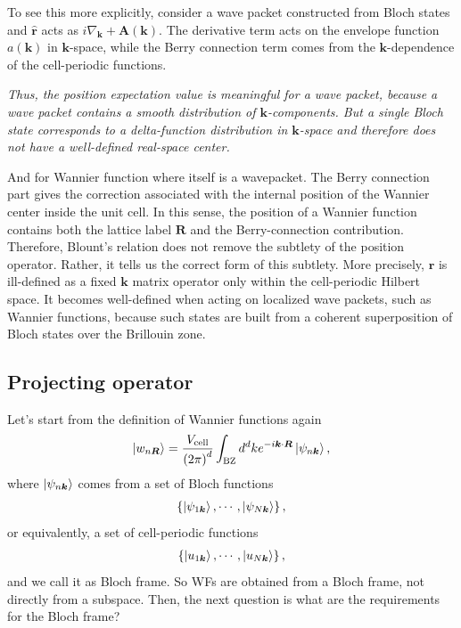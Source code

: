 \documentclass[12pt, oneside]{article}
\newcommand{\mr}[1]{\mathrm{#1}}
\newcommand{\p}[1]{\left(#1\right)}
\newcommand{\br}[1]{\left\{#1\right\}}
\numberwithin{equation}{subsection}
\begin{document}
To see this more explicitly, consider a wave packet constructed from Bloch states and \(\hat{\bm{r}}\) acts as \(i \nabla_{\bm{k}} + \bm{A} \p{\bm{k}}\). The derivative term acts on the envelope function \(a \p{\bm{k}}\) in \(\bm{k}\)-space, while the Berry connection term comes from the \(\bm{k}\)-dependence of the cell-periodic functions. 

\textit{Thus, the position expectation value is meaningful for a wave packet, because a wave packet contains a smooth distribution of \(\bm{k}\)-components. But a single Bloch state corresponds to a delta-function distribution in \(\bm{k}\)-space and therefore does not have a well-defined real-space center.}

And for Wannier function where itself is a wavepacket. The Berry connection part gives the correction associated with the internal position of the Wannier center inside the unit cell. In this sense, the position of a Wannier function contains both the lattice label \(\bm{R}\) and the Berry-connection contribution. Therefore, Blount’s relation does not remove the subtlety of the position operator. Rather, it tells us the correct form of this subtlety. More precisely, \(\bm{r}\) is ill-defined as a fixed \(\bm{k}\) matrix operator only within the cell-periodic Hilbert space. It becomes well-defined when acting on localized wave packets, such as Wannier functions, because such states are built from a coherent superposition of Bloch states over the Brillouin zone.

\vspace{1.5em}

\subsection{Projecting operator}

Let's start from the definition of Wannier functions again
\begin{align}
	\ket{w_{n \bm{R}}} = \frac{V_{\mr{cell}}}{\p{2 \pi}^d} \int_{\mr{BZ}} d^d k e^{-i \bm{k} \cdot 
	\bm{R}} \ket{\psi_{n \bm{k}}},
\end{align}
where \(\ket{\psi_{n \bm{k}}}\) comes from a set of Bloch functions 
\begin{align}
	\br{\ket{\psi_{1 \bm{k}}} , \cdots , \ket{\psi_{N \bm{k}}}},
\end{align}
or equivalently, a set of cell-periodic functions
\begin{align}
	\br{\ket{u_{1 \bm{k}}} , \cdots , \ket{u_{N \bm{k}}}},
\end{align}
and we call it as Bloch frame. So WFs are obtained from a Bloch frame, not directly from a subspace. Then, the next question is what are the requirements for the Bloch frame?
\end{document}
